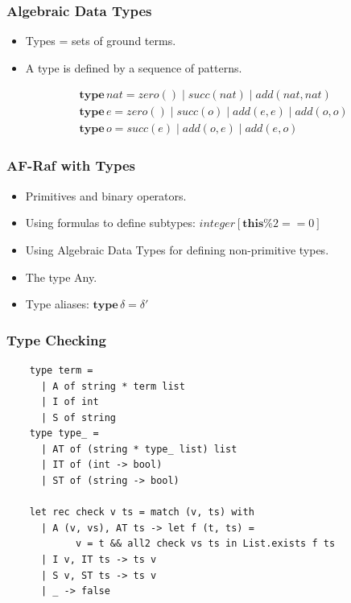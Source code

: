 \documentclass{beamer}
\begin{document}
\begin{frame}[fragile]
\frametitle{Algebraic Data Types}
\begin{itemize}
\item
  Types = sets of ground terms.
\item
  A type is defined by a sequence of patterns.
\end{itemize}
\begin{align}
&\mathbf{type}\,\mathit{nat} =
      \mathit{zero}()
  \mid\mathit{succ}(\mathit{nat})
  \mid\mathit{add}(\mathit{nat},\mathit{nat}) \\
&\mathbf{type}\,e =
      \mathit{zero}()
  \mid\mathit{succ}(o)
  \mid\mathit{add}(e,e)
  \mid\mathit{add}(o,o) \\
&\mathbf{type}\,o =
      \mathit{succ}(e)
  \mid\mathit{add}(o,e)
  \mid\mathit{add}(e,o)
\end{align}
\note[item]{}
\end{frame}

\begin{frame}[fragile]
\frametitle{AF-Raf with Types}
\begin{itemize}
\item
  Primitives and binary operators.
\item
  Using formulas to define subtypes:
 $\mathit{integer}[\mathbf{this}\%2==0]$ 
\item
  Using Algebraic Data Types for defining non-primitive types.
\item 
  The type Any.
\item 
  Type aliases: $\mathbf{type}\,\delta=\delta'$
\end{itemize}
\note[item]{}
\end{frame}

\begin{frame}[fragile]
\frametitle{Type Checking}
\begin{verbatim}
    type term = 
      | A of string * term list 
      | I of int 
      | S of string
    type type_ =
      | AT of (string * type_ list) list
      | IT of (int -> bool)
      | ST of (string -> bool)

    let rec check v ts = match (v, ts) with
      | A (v, vs), AT ts -> let f (t, ts) =
            v = t && all2 check vs ts in List.exists f ts
      | I v, IT ts -> ts v
      | S v, ST ts -> ts v
      | _ -> false
\end{verbatim}
\note[item]{}
\end{frame}
\end{document}

